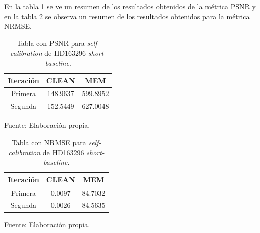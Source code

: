 En la tabla \ref{tab:real_short_selfcal_psnr} se ve un resumen de los resultados obtenidos de la métrica PSNR y en la tabla \ref{tab:real_short_selfcal_nrmse} se observa un resumen de los resultados obtenidos para la métrica NRMSE. 

\begin{table}[!ht]
	\begin{center}
		\caption{Tabla con PSNR para \textit{self-calibration} de HD163296 \textit{short-baseline}.}
		\begin{tabular}{| c | c | c |}
			\hline
			Iteración & CLEAN & MEM\\ \hline
			Primera & 148.9637 & 599.8952\\ \hline
            Segunda & 152.5449 & 627.0048\\ \hline
		\end{tabular}
		\label{tab:real_short_selfcal_psnr}
	\end{center}
	\begin{center}
		Fuente: Elaboración propia.
	\end{center}
\end{table}


\begin{table}[!ht]
	\begin{center}
		\caption{Tabla con NRMSE para \textit{self-calibration} de HD163296 \textit{short-baseline}.}
		\begin{tabular}{| c | c | c |}
			\hline
			Iteración & CLEAN & MEM\\ \hline
			Primera & 0.0097 & 84.7032\\ \hline
            Segunda & 0.0026 & 84.5635\\ \hline
		\end{tabular}
		\label{tab:real_short_selfcal_nrmse}
	\end{center}
	\begin{center}
		Fuente: Elaboración propia.
	\end{center}
\end{table}


